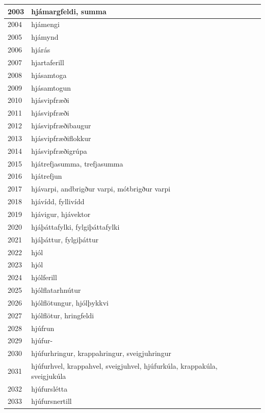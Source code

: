 \begin{longtable}{p{}|p{}|p{}|p{}|p{}}
\hline
2003 & hjámargfeldi, summa &  &  &  \\
\hline
2004 & hjámengi &  &  &  \\
\hline
2005 & hjámynd &  &  &  \\
\hline
2006 & hjárás &  &  &  \\
\hline
2007 & hjartaferill &  &  &  \\
\hline
2008 & hjásamtoga &  &  &  \\
\hline
2009 & hjásamtogun &  &  &  \\
\hline
2010 & hjásvipfræði &  &  &  \\
\hline
2011 & hjásvipfræði &  &  &  \\
\hline
2012 & hjásvipfræðibaugur &  &  &  \\
\hline
2013 & hjásvipfræðiflokkur &  &  &  \\
\hline
2014 & hjásvipfræðigrúpa &  &  &  \\
\hline
2015 & hjátrefjasumma, trefjasumma &  &  &  \\
\hline
2016 & hjátrefjun &  &  &  \\
\hline
2017 & hjávarpi, andbrigður varpi, mótbrigður varpi &  &  &  \\
\hline
2018 & hjávídd, fyllivídd &  &  &  \\
\hline
2019 & hjávigur, hjávektor &  &  &  \\
\hline
2020 & hjáþáttafylki, fylgiþáttafylki &  &  &  \\
\hline
2021 & hjáþáttur, fylgiþáttur &  &  &  \\
\hline
2022 & hjól &  &  &  \\
\hline
2023 & hjól &  &  &  \\
\hline
2024 & hjólferill &  &  &  \\
\hline
2025 & hjólflatarhnútur &  &  &  \\
\hline
2026 & hjólflötungur, hjólþykkvi &  &  &  \\
\hline
2027 & hjólflötur, hringfeldi &  &  &  \\
\hline
2028 & hjúfrun &  &  &  \\
\hline
2029 & hjúfur- &  &  &  \\
\hline
2030 & hjúfurhringur, krappahringur, sveigjuhringur &  &  &  \\
\hline
2031 & hjúfurhvel, krappahvel, sveigjuhvel, hjúfurkúla, krappakúla, sveigjukúla &  &  &  \\
\hline
2032 & hjúfurslétta &  &  &  \\
\hline
2033 & hjúfursnertill &  &  &  \\

\end{longtable}
